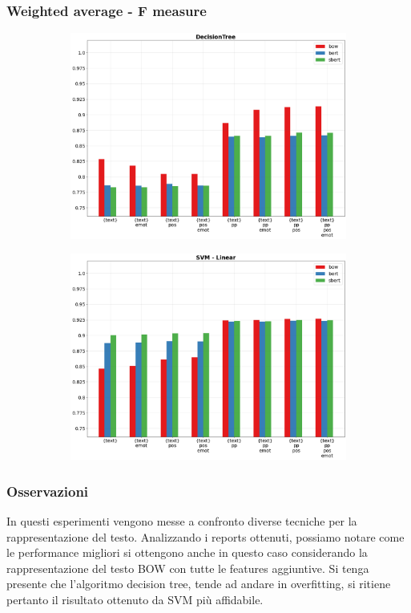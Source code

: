 \documentclass[oneside]{book}
\begin{document}
\subsubsection{Weighted average - F measure}

\begin{figure}[!h]
	\hspace*{-3cm}
	\begin{subfigure}[b]{0.5\textwidth}
		\centering
		\includegraphics[width=10cm]{assets/reports/text/f1/DecisionTree.png}
	\end{subfigure}
	\hfill
	\begin{subfigure}[b]{0.5\textwidth}		
		\centering
		\hspace*{0.15cm}
		\includegraphics[width=10cm]{assets/reports/text/f1/SVM - Linear.png}
	\end{subfigure}
\end{figure}
\newpage


\subsubsection{Osservazioni}
In questi esperimenti vengono messe a confronto diverse tecniche per la rappresentazione del testo. Analizzando i reports ottenuti, possiamo notare come le performance migliori si ottengono anche in questo caso considerando la rappresentazione del testo BOW con tutte le features aggiuntive. Si tenga presente che l'algoritmo decision tree, tende ad andare in overfitting, si ritiene pertanto il risultato ottenuto da SVM più affidabile.
\end{document}
